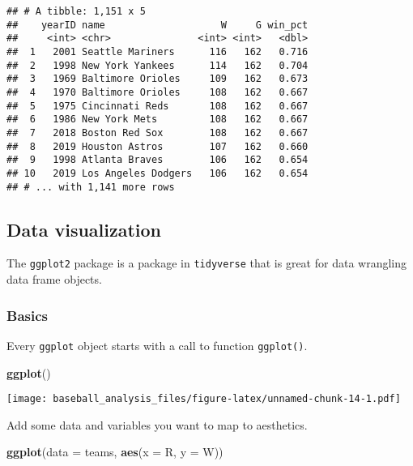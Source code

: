 \documentclass[
]{article}
\newenvironment{Shaded}{\begin{snugshade}}{\end{snugshade}}
\newcommand{\DataTypeTok}[1]{\textcolor[rgb]{0.13,0.29,0.53}{#1}}
\newcommand{\KeywordTok}[1]{\textcolor[rgb]{0.13,0.29,0.53}{\textbf{#1}}}
\newcommand{\NormalTok}[1]{#1}
\begin{document}
\begin{verbatim}
## # A tibble: 1,151 x 5
##    yearID name                    W     G win_pct
##     <int> <chr>               <int> <int>   <dbl>
##  1   2001 Seattle Mariners      116   162   0.716
##  2   1998 New York Yankees      114   162   0.704
##  3   1969 Baltimore Orioles     109   162   0.673
##  4   1970 Baltimore Orioles     108   162   0.667
##  5   1975 Cincinnati Reds       108   162   0.667
##  6   1986 New York Mets         108   162   0.667
##  7   2018 Boston Red Sox        108   162   0.667
##  8   2019 Houston Astros        107   162   0.660
##  9   1998 Atlanta Braves        106   162   0.654
## 10   2019 Los Angeles Dodgers   106   162   0.654
## # ... with 1,141 more rows
\end{verbatim}

\hypertarget{data-visualization}{%
\subsection{Data visualization}\label{data-visualization}}

The \texttt{ggplot2} package is a package in \texttt{tidyverse} that is
great for data wrangling data frame objects.

\hypertarget{basics}{%
\subsubsection{Basics}\label{basics}}

Every \texttt{ggplot} object starts with a call to function
\texttt{ggplot()}.

\begin{Shaded}
\begin{Highlighting}[]
\KeywordTok{ggplot}\NormalTok{()}
\end{Highlighting}
\end{Shaded}

\texttt{[image: baseball\_analysis\_files/figure-latex/unnamed-chunk-14-1.pdf]}

Add some data and variables you want to map to aesthetics.

\begin{Shaded}
\begin{Highlighting}[]
\KeywordTok{ggplot}\NormalTok{(}\DataTypeTok{data =}\NormalTok{ teams, }\KeywordTok{aes}\NormalTok{(}\DataTypeTok{x =}\NormalTok{ R, }\DataTypeTok{y =}\NormalTok{ W))}
\end{Highlighting}
\end{Shaded}
\end{document}
